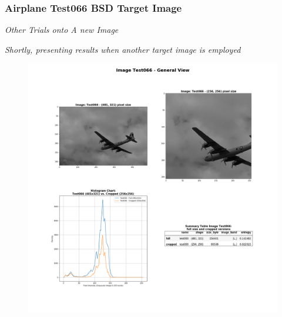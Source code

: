 \begin{frame}
    \frametitle{Airplane Test066 BSD Target Image}
        \begin{center}
            {\fontsize{40}{50}\selectfont \emph{Other Trials onto A new Image}}
        \end{center}
        \begin{center}
            \emph{Shortly, presenting results when another target image is employed}
        \end{center}
        \begin{figure}
            \includegraphics[scale=0.10]{slides/experiments/quant_dataset/images/complex_test066.png}
        \end{figure}
\end{frame}


